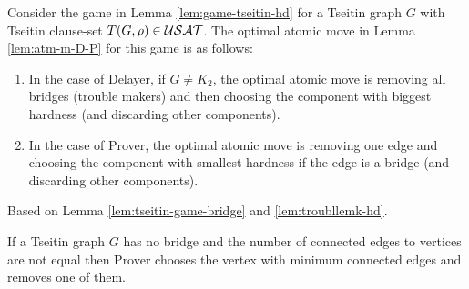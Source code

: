 \documentclass{report}
\begin{document}
\begin{lem}\label{lem:atmvtseitin}
Consider the game in Lemma \ref{lem:game-tseitin-hd} for a Tseitin graph $G$ with Tseitin clause-set $T(G,\rho) \in \mathcal{USAT}$. The optimal atomic move in Lemma \ref{lem:atm-m-D-P} for this game is as follows:
  \begin{enumerate}
  \item In the case of Delayer, if $G \not = K_2$, the optimal atomic move is removing all bridges (trouble makers) and then choosing the component with biggest hardness (and discarding other components).
  \item In the case of Prover, the optimal atomic move is removing one edge and choosing the component with smallest hardness if the edge is a bridge (and discarding other components).
  \end{enumerate}
\end{lem}
\begin{prf}
Based on Lemma \ref{lem:tseitin-game-bridge} and \ref{lem:troubllemk-hd}.
\end{prf}


\begin{conj}\label{con:nobridge-pd}
If a Tseitin graph $G$ has no bridge and the number of connected edges to vertices are not equal then Prover chooses the vertex with minimum connected edges and removes one of them.
\end{conj}
\end{document}
